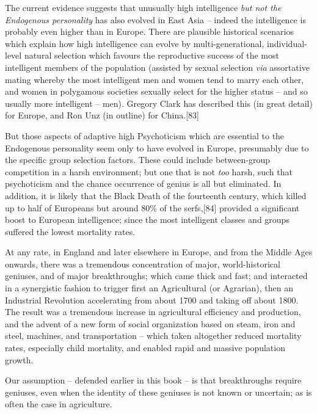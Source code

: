 \documentclass[
]{book}
\begin{document}
The current evidence suggests that unusually high intelligence \emph{but not the Endogenous personality} has also evolved in East Asia -- indeed the intelligence is probably even higher than in Europe. There are plausible historical scenarios which explain how high intelligence can evolve by multi-generational, individual-level natural selection which favours the reproductive success of the most intelligent members of the population (assisted by sexual selection \emph{via} assortative mating whereby the most intelligent men and women tend to marry each other, and women in polygamous societies sexually select for the higher status -- and so usually more intelligent -- men). Gregory Clark has described this (in great detail) for Europe, and Ron Unz (in outline) for China.{[}83{]}

But those aspects of adaptive high Psychoticism which are essential to the Endogenous personality seem only to have evolved in Europe, presumably due to the specific group selection factors. These could include between-group competition in a harsh environment; but one that is not \emph{too} harsh, such that psychoticism and the chance occurrence of genius is all but eliminated. In addition, it is likely that the Black Death of the fourteenth century, which killed up to half of Europeans but around 80\% of the serfs,{[}84{]} provided a significant boost to European intelligence; since the most intelligent classes and groups suffered the lowest mortality rates.

At any rate, in England and later elsewhere in Europe, and from the Middle Ages onwards, there was a tremendous concentration of major, world-historical geniuses, and of major breakthroughs; which came thick and fast; and interacted in a synergistic fashion to trigger first an Agricultural (or Agrarian), then an Industrial Revolution accelerating from about 1700 and taking off about 1800. The result was a tremendous increase in agricultural efficiency and production, and the advent of a new form of social organization based on steam, iron and steel, machines, and transportation -- which taken altogether reduced mortality rates, especially child mortality, and enabled rapid and massive population growth.

Our assumption -- defended earlier in this book -- is that breakthroughs require geniuses, even when the identity of these geniuses is not known or uncertain; as is often the case in agriculture.
\end{document}
